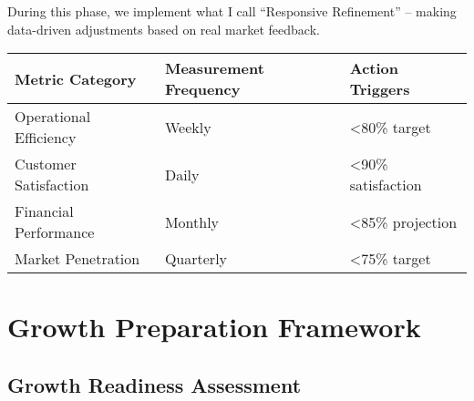During this phase, we implement what I call ``Responsive Refinement'' – making data-driven adjustments based on real market feedback.


\begin{tcolorbox}[colback=white,colframe=primarydark,title=\textbf{Key Performance Indicators}]
\begin{center}
\begin{tabularx}{\textwidth}{>{\raggedright\arraybackslash}X >{\centering\arraybackslash}X >{\raggedright\arraybackslash}X}
    \toprule
    \textbf{Metric Category} & \textbf{Measurement Frequency} & \textbf{Action Triggers} \\
    \midrule
    Operational Efficiency & Weekly & <80\% target \\
    Customer Satisfaction & Daily & <90\% satisfaction \\
    Financial Performance & Monthly & <85\% projection \\
    Market Penetration & Quarterly & <75\% target \\
    \bottomrule
\end{tabularx}
\end{center}
\end{tcolorbox}

\section{Growth Preparation Framework}\label{sec:growth-preparation}

\subsection{Growth Readiness Assessment}\label{subsec:growth-readiness}

